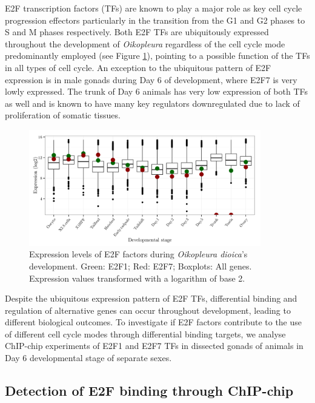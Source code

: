 \documentclass[11pt,twoside,a4paper]{report}
\begin{document}
	E2F transcription factors (TFs) are known to play a major role as key cell cycle progression effectors particularly in the transition from the G1 and G2 phases to S and M phases respectively. Both E2F TFs are ubiquitously expressed throughout the development of \textit{Oikopleura} regardless of the cell cycle mode predominantly employed (see Figure \ref{fig:E2F_expression}), pointing to a possible function of the TFs in all types of cell cycle. An exception to the ubiquitous pattern of E2F expression is in male gonads during Day 6 of development, where E2F7 is very lowly expressed. The trunk of Day 6 animals has very low expression of both TFs as well and is known to have many key regulators downregulated due to lack of proliferation of somatic tissues.
	
	\begin{figure}[here]
		\setlength{\belowcaptionskip}{5pt}
		\centering
		\includegraphics[width=0.9\textwidth]{pngs/E2F_expression_+allgenes.png}
		\caption[Expression levels of E2F factors during \textit{Oikopleura}'s development]
		{Expression levels of E2F factors during \textit{Oikopleura dioica}'s development.
			{
				\footnotesize
					Green: E2F1;
					Red: E2F7;
					Boxplots: All genes.
					Expression values transformed with a logarithm of base 2.
			}
		}
		\label{fig:E2F_expression}
	\end{figure}
	
	Despite the ubiquitous expression pattern of E2F TFs, differential binding and regulation of alternative genes can occur throughout development, leading to different biological outcomes. To investigate if E2F factors contribute to the use of different cell cycle modes through differential binding targets, we analyse ChIP-chip experiments of E2F1 and E2F7 TFs in dissected gonads of animals in Day 6 developmental stage of separate sexes.

	\subsection{Detection of E2F binding through ChIP-chip}
\end{document}
